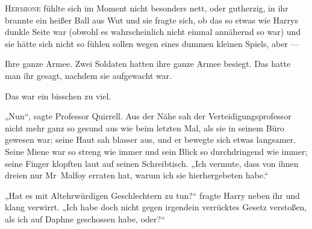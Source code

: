 
\lettrine{H}{ermione} fühlte sich im Moment nicht besonders nett, oder gutherzig, in ihr brannte ein heißer Ball aus Wut und sie fragte sich, ob das so etwas wie Harrys dunkle Seite war (obwohl es wahrscheinlich nicht einmal annähernd so war) und sie hätte sich nicht so fühlen sollen wegen eines dummen kleinen Spiels, aber —

Ihre ganze Armee. Zwei Soldaten hatten ihre ganze Armee besiegt. Das hatte man ihr gesagt, nachdem sie aufgewacht war.

Das war ein bisschen zu viel.

„Nun“, sagte Professor Quirrell. Aus der Nähe sah der Verteidigungsprofessor nicht mehr ganz so gesund aus wie beim letzten Mal, als sie in seinem Büro gewesen war; seine Haut sah blasser aus, und er bewegte sich etwas langsamer. Seine Miene war so streng wie immer und sein Blick so durchdringend wie immer; seine Finger klopften laut auf seinen Schreibtisch.
„Ich vermute, dass von ihnen dreien nur Mr~Malfoy erraten hat, warum ich sie hierhergebeten habe.“

„Hat es mit Altehrwürdigen Geschlechtern zu tun?“ fragte Harry neben ihr und klang verwirrt.
„Ich habe doch nicht gegen irgendein verrücktes Gesetz verstoßen, als ich auf Daphne geschossen habe, oder?“

